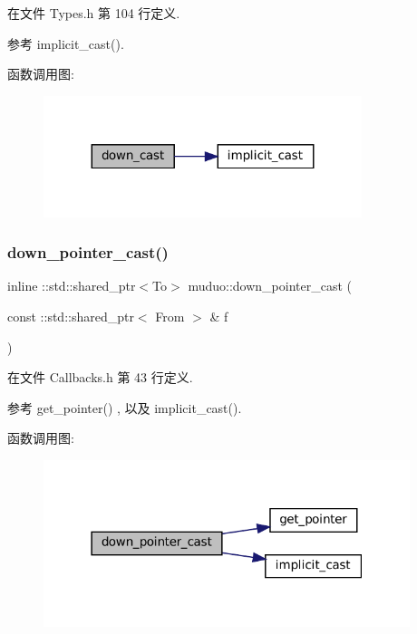 在文件 Types.\+h 第 104 行定义.



参考 implicit\+\_\+cast().

函数调用图\+:
\nopagebreak
\begin{figure}[H]
\begin{center}
\leavevmode
\includegraphics[width=263pt]{namespacemuduo_a4a5610d86660bbd28e059ebb1ffc8316_cgraph}
\end{center}
\end{figure}
\mbox{\label{namespacemuduo_a1836aa0a42711172d5598fbfda6fb588}} 
\subsubsection{\texorpdfstring{down\+\_\+pointer\+\_\+cast()}{down\_pointer\_cast()}}
{\footnotesize\ttfamily inline \+::std\+::shared\+\_\+ptr$<$To$>$ muduo\+::down\+\_\+pointer\+\_\+cast (\begin{DoxyParamCaption}\item[{const \+::std\+::shared\+\_\+ptr$<$ From $>$ \&}]{f }\end{DoxyParamCaption})}



在文件 Callbacks.\+h 第 43 行定义.



参考 get\+\_\+pointer() , 以及 implicit\+\_\+cast().

函数调用图\+:
\nopagebreak
\begin{figure}[H]
\begin{center}
\leavevmode
\includegraphics[width=303pt]{namespacemuduo_a1836aa0a42711172d5598fbfda6fb588_cgraph}
\end{center}
\end{figure}
\mbox{\label{namespacemuduo_a2ad8a8650556c05bae4c4f449ac6d106}} 
